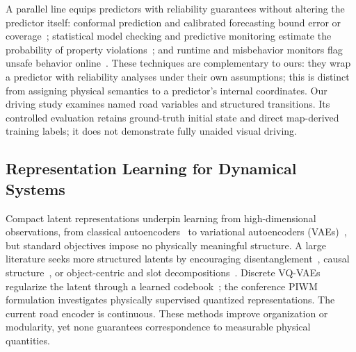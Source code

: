 \documentclass[preprint,12pt]{elsarticle}
\begin{document}
A parallel line equips predictors with reliability guarantees without altering
the predictor itself: conformal prediction and calibrated forecasting bound error
or coverage~\cite{lindemann2023conformal, lu2024towards, ruchkin2022confidence,
cleaveland2022risk}; statistical model checking and predictive monitoring estimate
the probability of property violations~\cite{qin2022statistical, zarei2020statistical,
cairoli2021neural, waga2022dynamic}; and runtime and misbehavior monitors flag
unsafe behavior online~\cite{stocco2020misbehaviour, ma2020stlnet, mao2024safe,
mao2025safe}.
These techniques are complementary to ours: they wrap a predictor with reliability analyses under their own assumptions; this is distinct from
assigning physical semantics to a predictor's internal coordinates.
Our driving study examines named road variables and structured transitions.
Its controlled evaluation retains ground-truth initial state and direct map-derived
training labels; it does not demonstrate fully unaided visual driving.

\subsection{Representation Learning for Dynamical Systems}\label{sec:rw_repr}

Compact latent representations underpin learning from high-dimensional
observations, from classical autoencoders~\cite{Hinton06} to variational
autoencoders (VAEs)~\cite{kingma2013auto}, but standard objectives impose no
physically meaningful structure.
A large literature seeks more structured latents by encouraging
disentanglement~\cite{higgins2017beta, kim2018disentangling, chen2018isolating},
causal structure~\cite{yang2021causalvae, scholkopf2021toward}, or object-centric
and slot decompositions~\cite{mosbach2025soldslotobjectcentriclatent}.
Discrete VQ-VAEs regularize the latent through a learned
codebook~\cite{van2017neural, razavi2019generating}; the conference PIWM formulation investigates physically supervised
quantized representations. The current road encoder is continuous.
These methods improve organization or modularity, yet none guarantees
correspondence to measurable physical quantities.
\end{document}
